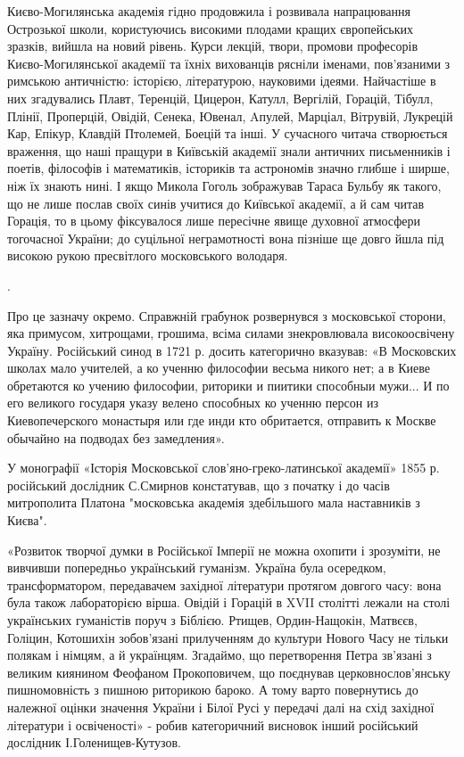 Києво-Могилянська академія гідно продовжила і розвивала напрацювання Острозької
школи, користуючись високими плодами кращих європейських зразків, вийшла на
новий рівень. Курси лекцій, твори, промови професорів Києво-Могилянської
академії та їхніх вихованців рясніли іменами, пов'язаними з римською
античністю: історією, літературою, науковими ідеями. Найчастіше в них
згадувались Плавт, Теренцій, Цицерон, Катулл, Вергілій, Горацій, Тібулл,
Плінії, Проперцій, Овідій, Сенека, Ювенал, Aпулей, Марціал, Вітрувій, Лукрецій
Кар, Епікур, Клавдій Птолемей, Боецій та інші. У сучасного читача створюється
враження, що наші пращури в Київській академії знали античних письменників і
поетів, філософів і математиків, істориків та астрономів значно глибше і ширше,
ніж їх знають нині. І якщо Микола Гоголь зображував Тараса Бульбу як такого, що
не лише послав своїх синів учитися до Київської академії, а й сам читав
Горація, то в цьому фіксувалося лише пересічне явище духовної атмосфери
тогочасної України; до суцільної неграмотності вона пізніше ще довго йшла під
високою рукою пресвітлого московського володаря.

.

Про це зазначу окремо. Справжній грабунок розвернувся з московської сторони,
яка примусом, хитрощами, грошима, всіма силами знекровлювала високоосвічену
Україну. Російський синод в 1721 р. досить категорично вказував: «В Московских
школах мало учителей, а ко ученню философии весьма никого нет; а в Киеве
обретаются ко учению философии, риторики и пиитики способныи мужи... И по его
великого государя указу велено способных ко ученню персон из Киевопечерского
монастыря или где инди кто обритается, отправить к Москве обычайно на подводах
без замедления». 

У монографії «Історія Московської слов’яно-греко-латинської академії» 1855 р.
російський дослідник С.Смирнов констатував, що з початку і до часів митрополита
Платона "московська академія здебільшого мала наставників з Києва".

«Розвиток творчої думки в Російської Імперії не можна охопити і зрозуміти, не
вивчивши попередньо український гуманізм. Україна була осередком,
трансформатором, передавачем західної літератури протягом довгого часу: вона
була також лабораторією вірша. Овідій і Горацій в XVII столітті лежали на столі
українських гуманістів поруч з Біблією. Ртищев, Ордин-Нащокін, Матвєєв,
Голіцин, Котошихін зобов'язані прилученням до культури Нового Часу не тільки
полякам і німцям, а й українцям. Згадаймо, що перетворення Петра зв'язані з
великим киянином Феофаном Прокоповичем, що поєднував церковнослов'янську
пишномовність з пишною риторикою бароко. А тому варто повернутись до належної
оцінки значення України і Білої Русі у передачі далі на схід західної
літератури і освіченості» - робив категоричний висновок інший російський
дослідник І.Голенищев-Кутузов.

